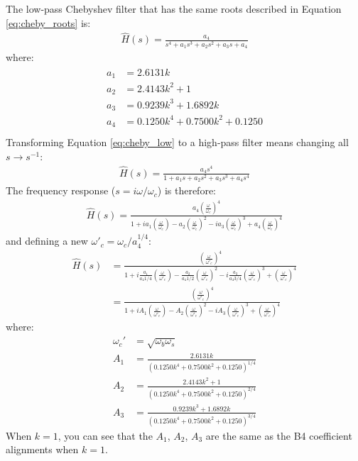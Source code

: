 \documentclass[10pt]{book}
\begin{document}
The low-pass Chebyshev filter that has the same roots described in Equation \ref{eq:cheby_roots} is:
\begin{align}
\hat{H}(s)=\frac{a_4}{s^4+a_1s^3+a_2s^2+a_3s+a_4}\label{eq:cheby_low}
\end{align}
where:
\begin{align}
\begin{split}
a_1&=2.6131k \\
a_2&=2.4143k^2+1\\
a_3&=0.9239k^3+1.6892k \\
a_4&=0.1250k^4+0.7500k^2+0.1250\\
\end{split}
\end{align}
Transforming Equation \ref{eq:cheby_low} to a high-pass filter means changing all $s\rightarrow s^{-1}$:
\begin{align}
\hat{H}(s)=\frac{a_4s^4}{1+a_1s+a_2s^2+a_3s^3+a_4s^4}
\end{align}
The frequency response ($s=i\omega/\omega_c$) is therefore:
\begin{align}
\hat{H}(s)=\frac{a_4\left(\frac{\omega}{\omega_c}\right)^4}{1+i a_1\left(\frac{\omega}{\omega_c}\right)-a_2\left(\frac{\omega}{\omega_c}\right)^2-ia_3\left(\frac{\omega}{\omega_c}\right)^3+a_4\left(\frac{\omega}{\omega_c}\right)^4}
\end{align}
and defining a new $\omega'_c=\omega_c /a_4^{1/4}$:
\begin{align}
\hat{H}(s)&=\frac{\left(\frac{\omega}{\omega'_c}\right)^4}{1+i\frac{a_1}{a_4{1/4}}\left(\frac{\omega}{\omega'_c}\right)-\frac{a_2}{a_4{1/2}}\left(\frac{\omega}{\omega'_c}\right)^2-i\frac{a_3}{a_4{3/4}}\left(\frac{\omega}{\omega'_c}\right)^3+\left(\frac{\omega}{\omega'_c}\right)^4}\\
&=\frac{\left(\frac{\omega}{\omega'_c}\right)^4}{1+iA_1 \left(\frac{\omega}{\omega'_c}\right)-A_2\left(\frac{\omega}{\omega'_c}\right)^2-iA_3\left(\frac{\omega}{\omega'_c}\right)^3+\left(\frac{\omega}{\omega'_c}\right)^4}\label{eq:c4-transfer}
\end{align}
where:
\begin{align}
\omega_c'&=\sqrt{\omega_b\omega_s}\\
A_1&=\frac{2.6131k}{(0.1250k^4+0.7500k^2+0.1250)^{1/4}} \\
A_2&=\frac{2.4143k^2+1}{(0.1250k^4+0.7500k^2+0.1250)^{2/4}} \\
A_3&=\frac{0.9239k^3+1.6892k}{(0.1250k^4+0.7500k^2+0.1250)^{3/4}}
\end{align}
When $k=1$, you can see that the $A_1$, $A_2$, $A_3$ are the same as the B4 coefficient alignments when $k=1$.
\end{document}
